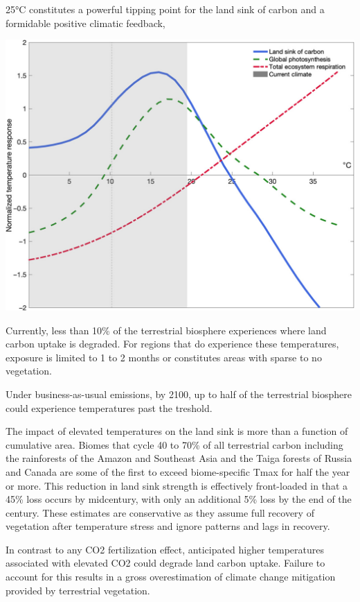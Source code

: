 \documentclass[
]{book}
\begin{document}
25°C constitutes a powerful tipping point for the land
sink of carbon and a formidable positive climatic feedback,

\includegraphics{fig/Land_Sink_of_Carbon.jpg}

Currently, less than 10\% of the terrestrial biosphere experiences
where land carbon uptake is degraded.
For regions that do experience these temperatures,
exposure is limited to 1 to 2 months or
constitutes areas with sparse to no vegetation.

Under business-as-usual emissions, by 2100, up to half
of the terrestrial biosphere could experience temperatures past
the treshold.

The impact of elevated temperatures on the land sink is more than a
function of cumulative area.
Biomes that cycle 40 to 70\% of all terrestrial carbon
including the rainforests of the Amazon and Southeast Asia and
the Taiga forests of Russia and Canada
are some of the first to exceed biome-specific Tmax
for half the year or more.
This reduction in land sink strength is effectively front-loaded
in that a 45\% loss occurs by midcentury,
with only an additional 5\% loss by the end of the century.
These estimates are conservative as they assume
full recovery of vegetation after temperature stress and
ignore patterns and lags in recovery.

In contrast to any CO2 fertilization effect,
anticipated higher temperatures associated with
elevated CO2 could degrade land carbon uptake.
Failure to account for this results in
a gross overestimation of climate change mitigation provided by terrestrial vegetation.
\end{document}
